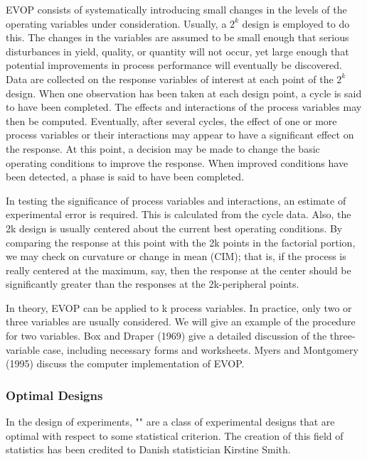 	EVOP consists of systematically introducing small changes in the levels of the operating variables under consideration. Usually, a $2^k$ design is employed to do this. The changes in the variables are assumed to be small enough that serious disturbances in yield, quality, or quantity will not occur, yet large enough that potential improvements in process performance will eventually be discovered. Data are collected on the response variables of interest at each point of the $2^k$ design. When one observation has been taken at each design point, a cycle is said to have been completed. The effects and interactions of the process variables may then be computed. Eventually, after several cycles, the effect of one or more process variables or their interactions may appear to have a significant effect on the response. At this point, a decision may be made to change the basic operating conditions to improve the response. When improved conditions have been detected, a phase is said to have been completed. 
	
	In testing the significance of process variables and interactions, an estimate of experimental error is required. This is calculated from the cycle data. Also, the 2k design is usually centered about the current best operating conditions. By comparing the response at this point with the 2k points in the factorial portion, we may check on curvature or change in mean (CIM); that is, if the process is really centered at the maximum, say, then the response at the center should be significantly greater than the responses at the 2k-peripheral points.
	
	In theory, EVOP can be applied to k process variables. In practice, only two or three variables are usually considered. We will give an example of the procedure for two variables. Box and Draper (1969) give a detailed discussion of the three-variable case, including necessary forms and worksheets. Myers and Montgomery (1995) discuss the computer implementation of EVOP.
	
	\pagebreak
	\subsubsection{Optimal Designs}\label{optimal designs}
	In the design of experiments, "" are a class of experimental designs that are optimal with respect to some statistical criterion. The creation of this field of statistics has been credited to Danish statistician Kirstine Smith.

